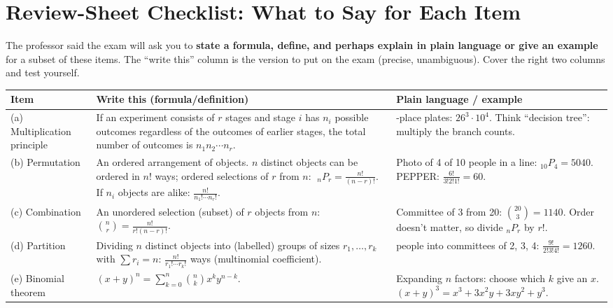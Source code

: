 \documentclass[11pt]{article}
\begin{document}
\clearpage
\section{Review-Sheet Checklist: What to Say for Each Item}\label{sec:checklist}

The professor said the exam will ask you to \textbf{state a formula, define, and perhaps explain in plain language or give an example} for a subset of these items. The ``write this'' column is the version to put on the exam (precise, unambiguous). Cover the right two columns and test yourself.

\begin{center}
\renewcommand{\arraystretch}{1.3}
\small
\begin{longtable}{@{}>{\raggedright\arraybackslash}p{1.0in}>{\raggedright\arraybackslash}p{2.8in}>{\raggedright\arraybackslash}p{2.3in}@{}}
\toprule
\textbf{Item} & \textbf{Write this (formula/definition)} & \textbf{Plain language / example}\\
\midrule
\endhead
(a) Multiplication principle & If an experiment consists of $r$ stages and stage $i$ has $n_i$ possible outcomes regardless of the outcomes of earlier stages, the total number of outcomes is $n_1n_2\cdots n_r$. & 7-place plates: $26^3\cdot10^4$. Think ``decision tree'': multiply the branch counts.\\
(b) Permutation & An ordered arrangement of objects. $n$ distinct objects can be ordered in $n!$ ways; ordered selections of $r$ from $n$: $\;{}_nP_r=\frac{n!}{(n-r)!}$. If $n_i$ objects are alike: $\frac{n!}{n_1!\cdots n_r!}$. & Photo of 4 of 10 people in a line: ${}_{10}P_4=5040$. PEPPER: $\frac{6!}{3!2!1!}=60$.\\
(c) Combination & An unordered selection (subset) of $r$ objects from $n$: $\binom nr=\frac{n!}{r!(n-r)!}$. & Committee of 3 from 20: $\binom{20}3=1140$. Order doesn't matter, so divide ${}_nP_r$ by $r!$.\\
(d) Partition & Dividing $n$ distinct objects into (labelled) groups of sizes $r_1,\dots,r_k$ with $\sum r_i=n$: $\frac{n!}{r_1!\cdots r_k!}$ ways (multinomial coefficient). & 9 people into committees of 2, 3, 4: $\frac{9!}{2!3!4!}=1260$.\\
(e) Binomial theorem & $(x+y)^n=\sum_{k=0}^n\binom nkx^ky^{n-k}$. & Expanding $n$ factors: choose which $k$ give an $x$. $(x+y)^3=x^3+3x^2y+3xy^2+y^3$.\\

\end{longtable}
\end{center}
\end{document}
